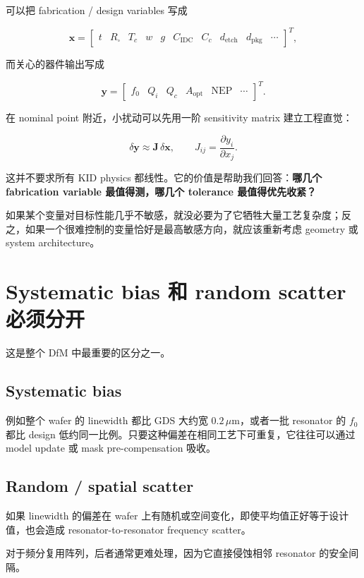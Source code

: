 可以把 fabrication / design variables 写成

\[
\mathbf{x}=
\begin{bmatrix}
 t & R_\square & T_c & w & g & C_{\mathrm{IDC}} & C_c & d_{\mathrm{etch}} & d_{\mathrm{pkg}} & \cdots
\end{bmatrix}^{\!T},
\]

而关心的器件输出写成

\[
\mathbf{y}=
\begin{bmatrix}
 f_0 & Q_i & Q_c & A_{\mathrm{opt}} & \mathrm{NEP} & \cdots
\end{bmatrix}^{\!T}.
\]

在 nominal point 附近，小扰动可以先用一阶 sensitivity matrix 建立工程直觉：

\[
\delta\mathbf{y}\approx \mathbf{J}\,\delta\mathbf{x},
\qquad
J_{ij}=\frac{\partial y_i}{\partial x_j}.
\]

这并不要求所有 KID physics 都线性。它的价值是帮助我们回答：\textbf{哪几个 fabrication variable 最值得测，哪几个 tolerance 最值得优先收紧？}

如果某个变量对目标性能几乎不敏感，就没必要为了它牺牲大量工艺复杂度；反之，如果一个很难控制的变量恰好是最高敏感方向，就应该重新考虑 geometry 或 system architecture。

\section{Systematic bias 和 random scatter 必须分开}

这是整个 DfM 中最重要的区分之一。

\subsection{Systematic bias}

例如整个 wafer 的 linewidth 都比 GDS 大约宽 $0.2\,\mu$m，或者一批 resonator 的 $f_0$ 都比 design 低约同一比例。只要这种偏差在相同工艺下可重复，它往往可以通过 model update 或 mask pre-compensation 吸收。

\subsection{Random / spatial scatter}

如果 linewidth 的偏差在 wafer 上有随机或空间变化，即使平均值正好等于设计值，也会造成 resonator-to-resonator frequency scatter。

对于频分复用阵列，后者通常更难处理，因为它直接侵蚀相邻 resonator 的安全间隔。

